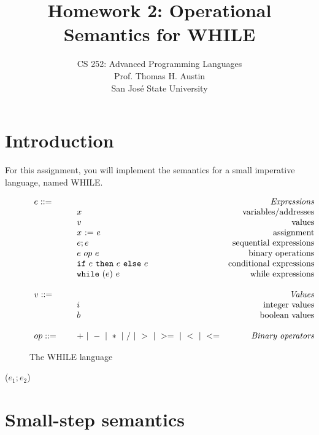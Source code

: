 \documentclass{article}
\title{Homework 2: Operational Semantics for WHILE}
\author{
  CS 252: Advanced Programming Languages \\
  Prof. Thomas H. Austin \\
  San Jos\'{e} State University \\
  }
\date{}
\newcommand{\rel}[1]{ \mbox{\sc [#1]} }
\begin{document}
\maketitle

\section{Introduction}

For this assignment,
you will implement the semantics for a small imperative language, named WHILE.

\newcommand{\mydefhead}[2]{\multicolumn{2}{l}{{#1}}&\mbox{\emph{#2}}\\}
\newcommand{\mydefcase}[2]{\qquad\qquad& #1 &\mbox{#2}\\}

\newcommand{\assign}[2]{#1~{:=}~#2}
\newcommand{\ife}[3]{\mbox{\tt if}~{#1}~\mbox{\tt then}~{#2}~\mbox{\tt else}~{#3}}
\newcommand{\whilee}[2]{\mbox{\tt while}~(#1)~#2}
\newcommand{\true}{\mbox{\tt true}}
\newcommand{\false}{\mbox{\tt false}}

\begin{figure}\label{fig:lang}
\caption{The WHILE language}
\[
\begin{array}{llr}
  \mydefhead{e ::=\qquad\qquad\qquad\qquad}{Expressions}
  \mydefcase{x}{variables/addresses}
  \mydefcase{v}{values}
  \mydefcase{\assign x e}{assignment}
  \mydefcase{e; e}{sequential expressions}
  \mydefcase{e ~op~ e}{binary operations}
  \mydefcase{\ife e e e}{conditional expressions}
  \mydefcase{\whilee e e}{while expressions}
  \\
  \mydefhead{v ::=\qquad\qquad\qquad\qquad}{Values}
  \mydefcase{i}{integer values}
  \mydefcase{b}{boolean values}
  \\
  op ::= & + ~|~ - ~|~ * ~|~ / ~|~ > ~|~ >= ~|~ < ~|~ <=  & \mbox{\emph{Binary operators}} \\
\end{array}
\]
\end{figure}
($e_1;e_2$)



\section{Small-step semantics}

\newcommand{\ssrule}[3]{
  \rel{#1} &
  \frac{\strut\begin{array}{@{}c@{}} #2 \end{array}}
       {\strut\begin{array}{@{}c@{}} #3 \end{array}}
   \\~\\
}
\newcommand{\sstep}[4]{\ctxt[{#1}],{#2} \rightarrow \ctxt[{#3}],{#4}}
\newcommand{\sstepraw}[4]{{#1},{#2} \rightarrow {#3},{#4}}
\newcommand{\ctxt}{C}
\end{document}
